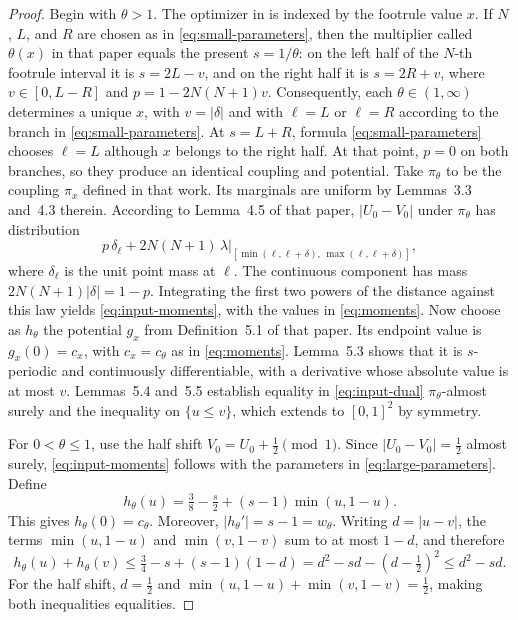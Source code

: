 \documentclass{article}
\theoremstyle{definition}
\theoremstyle{remark}
\newcommand{\1}{\mathds{1}}
\newcommand{\I}{[0,1]}
\begin{document}
\begin{proof}
	Begin with $\theta>1$.
	The optimizer in \citet[Sec.~4]{ansari2026exact} is indexed by the footrule value $x$. If $N$, $L$, and $R$ are chosen as in \eqref{eq:small-parameters}, then the multiplier called $\theta(x)$ in that paper equals the present $s=1/\theta$: on the left half of the $N$-th footrule interval it is $s=2L-v$, and on the right half it is $s=2R+v$, where $v\in[0,L-R]$ and $p=1-2N(N+1)v$.
	Consequently, each $\theta\in(1,\infty)$ determines a unique $x$, with $v=|\delta|$ and with $\ell=L$ or $\ell=R$ according to the branch in \eqref{eq:small-parameters}. At $s=L+R$, formula \eqref{eq:small-parameters} chooses $\ell=L$ although $x$ belongs to the right half. At that point, $p=0$ on both branches, so they produce an identical coupling and potential.
	Take $\pi_\theta$ to be the coupling $\pi_x$ defined in that work. Its marginals are uniform by Lemmas~3.3 and~4.3 therein.
	According to Lemma~4.5 of that paper, $|U_0-V_0|$ under $\pi_\theta$ has distribution
	\[
		p\,\delta_\ell+2N(N+1)\,\lambda\big|_{[\min(\ell,\ell+\delta),\,\max(\ell,\ell+\delta)]},
	\]
	where $\delta_\ell$ is the unit point mass at $\ell$.
	The continuous component has mass $2N(N+1)|\delta|=1-p$. Integrating the first two powers of the distance against this law yields \eqref{eq:input-moments}, with the values in \eqref{eq:moments}.
	Now choose as $h_\theta$ the potential $g_x$ from Definition~5.1 of that paper.
	Its endpoint value is $g_x(0)=c_x$, with $c_x=c_\theta$ as in \eqref{eq:moments}. Lemma~5.3 shows that it is $s$-periodic and continuously differentiable, with a derivative whose absolute value is at most $v$. Lemmas~5.4 and~5.5 establish equality in \eqref{eq:input-dual} $\pi_\theta$-almost surely and the inequality on $\{u\le v\}$, which extends to $\I^2$ by symmetry.

	For $0<\theta\le1$, use the half shift $V_0=U_0+\tfrac12\pmod1$. Since $|U_0-V_0|=\tfrac12$ almost surely, \eqref{eq:input-moments} follows with the parameters in \eqref{eq:large-parameters}. Define
	\begin{equation}\label{eq:halfshift-dual}
		h_\theta(u)=\tfrac38-\tfrac s2+(s-1)\min(u,1-u).
	\end{equation}
	This gives $h_\theta(0)=c_\theta$. Moreover, $|h_\theta'|=s-1=w_\theta$.
	Writing $d=|u-v|$, the terms $\min(u,1-u)$ and $\min(v,1-v)$ sum to at most $1-d$, and therefore
	\[
		h_\theta(u)+h_\theta(v)\le\tfrac34-s+(s-1)(1-d)=d^2-sd-(d-\tfrac12)^2\le d^2-sd.
	\]
	For the half shift, $d=\tfrac12$ and $\min(u,1-u)+\min(v,1-v)=\tfrac12$, making both inequalities equalities.
\end{proof}
\end{document}
